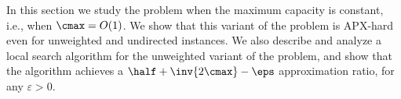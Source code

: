 In this section we study the \carpool problem when the maximum
capacity is constant, i.e., when $\cmax = O(1)$.  We show that this
variant of the problem is APX-hard even for unweighted and undirected
instances.  We also describe and analyze a local search algorithm for
the unweighted variant of the problem, and show that the algorithm
achieves a $\half + \inv{2\cmax} - \eps$ approximation ratio, for any
$\varepsilon > 0$.


